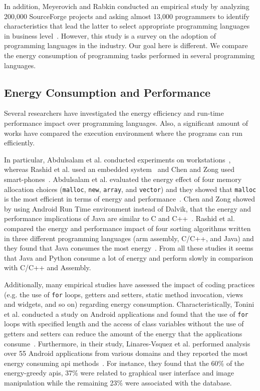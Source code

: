 In addition, Meyerovich and Rabkin conducted an empirical study 
by analyzing 200,000 SourceForge projects and asking almost 
13,000 programmers to identify characteristics that lead the 
latter to select appropriate programming languages in business 
level~\cite{MR13}.
However, this study is a survey on the adoption of programming 
languages in the industry.
Our goal here is different.
We compare the energy consumption of programming tasks
performed in several programming languages.


\subsection{Energy Consumption and Performance}
Several researchers have investigated the energy efficiency and 
run-time performance impact over programming languages.
Also, a significant amount of works have compared the execution
environment where the programs can run efficiently.

In particular, Abdulsalam et al. conducted experiments on 
workstations~\cite{ALG14}, whereas Rashid et al. used an embedded 
system~\cite{RAT15} and
Chen and Zong used smart-phones~\cite{CZ16}.
Abdulsalam et al. evaluated the energy effect of four memory
allocation choices ({\tt malloc}, {\tt new}, {\tt array}, and 
{\tt vector}) and they showed that {\tt malloc} is the most 
efficient in terms of energy and performance~\cite{ALG14}.
Chen and Zong showed by using Android Run Time environment instead 
of Dalvik, that the energy and performance implications of Java
are similar to C and C++~\cite{CZ16}.
Rashid et al. compared the energy and performance impact of four 
sorting algorithms written in three different programming 
languages ({\sc arm} assembly, C/C++, and Java) and they found that 
Java consumes the most energy~\cite{RAT15}.
From all these studies it seems that Java and Python consume a 
lot of energy and perform slowly in comparison with C/C++ and 
Assembly.

Additionally, many empirical studies have assessed the impact
of coding practices
(e.g. the use of {\tt for} loops, getters and setters,
static method invocation, views and widgets, and so on)
regarding energy consumption.
Characteristically, Tonini et al. conducted a study on Android 
applications and found that the use of {\tt for} loops with 
specified length and the access of class variables without 
the use of getters and setters can reduce the amount of the 
energy that the applications consume~\cite{TFM13}.
Furthermore, in their study, Linares-Vsquez et al. performed 
analysis over 55 Android applications from various domains
and they reported the most energy consuming {\sc api} 
methods~\cite{LBB14}.
For instance, they found that the 60\% of the energy-greedy 
{\sc api}s, 37\% were related to graphical user interface and
image manipulation while the remaining 23\% were associated 
with the database.

